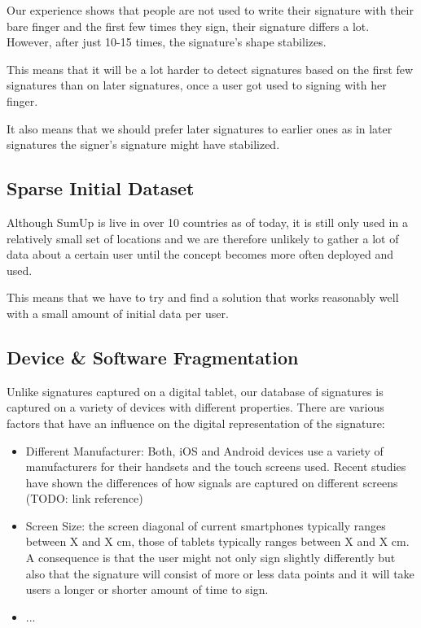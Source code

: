 \documentclass[a4paper, oneside]{csthesis}
\begin{document}
Our experience shows that people are not used to write their signature with their bare finger and the first few times they sign, their signature differs a lot. However, after just 10-15 times, the signature's shape stabilizes.

This means that it will be a lot harder to detect signatures based on the first few signatures than on later signatures, once a user got used to signing with her finger.

It also means that we should prefer later signatures to earlier ones as in later signatures the signer's signature might have stabilized.


\subsection{Sparse Initial Dataset}

Although SumUp is live in over 10 countries as of today, it is still only used in a relatively small set of locations and we are therefore unlikely to gather a lot of data about a certain user until the concept becomes more often deployed and used.

This means that we have to try and find a solution that works reasonably well with a small amount of initial data per user.


\subsection{Device \& Software Fragmentation}

Unlike signatures captured on a digital tablet, our database of signatures is captured on a variety of devices with different properties. There are various factors that have an influence on the digital representation of the signature:

\begin{itemize}
\item Different Manufacturer: Both, iOS and Android devices use a variety of manufacturers for their handsets and the touch screens used. Recent studies have shown the differences of how signals are captured on different screens (TODO: link reference)
\item Screen Size: the screen diagonal of current smartphones typically ranges between X and X cm, those of tablets typically ranges between X and X cm. A consequence is that the user might not only sign slightly differently but also that the signature will consist of more or less data points and it will take users a longer or shorter amount of time to sign.
\item  ...
\end{itemize}
\end{document}
